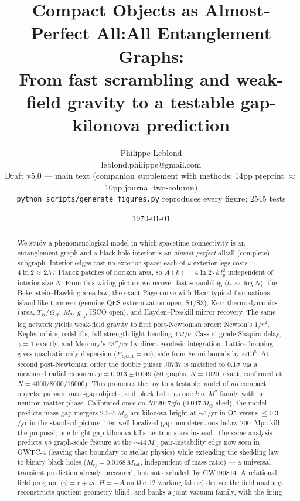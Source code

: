 \documentclass[11pt]{article}
\title{Compact Objects as Almost-Perfect All:All Entanglement Graphs:\\
\large From fast scrambling and weak-field gravity to a testable gap-kilonova prediction}
\author{Philippe Leblond \\ \small leblond.philippe@gmail.com \\
\small Draft v5.0 --- main text (companion supplement with methods; 14pp preprint $\approx$ 10pp journal two-column) \\
\small\texttt{python scripts/generate\_figures.py} reproduces every figure; 2545 tests}
\date{\today}
\begin{document}
\maketitle

\begin{abstract}
We study a phenomenological model in which spacetime connectivity is an
entanglement graph and a black-hole interior is an \emph{almost-perfect}
all:all (complete) subgraph. Interior edges cost no exterior space; each of
$k$ exterior legs costs $4\ln 2 \approx 2.77$ Planck patches of horizon area,
so $A(k) = 4\ln 2\cdot k\,l_p^2$ independent of interior size $N$. From this
wiring picture we recover fast scrambling ($t_* \sim \log N$), the
Bekenstein--Hawking area law, the exact Page curve with Haar-typical
fluctuations, island-like turnover (genuine QES extremization open,
S1/S3), Kerr thermodynamics (area, $T_H$/$\Omega_H$; $M_2$, $g_{t\phi}$, ISCO open), and Hayden--Preskill
mirror recovery. The same leg network yields weak-field gravity to first
post-Newtonian order: Newton's $1/r^2$, Kepler orbits, redshifts,
full-strength light bending $4M/b$, Cassini-grade Shapiro delay, $\gamma = 1$
exactly, and Mercury's $43''$/cy by direct geodesic integration. Lattice
hopping gives quadratic-only dispersion ($E_{QG,1} = \infty$), safe from Fermi
bounds by $\sim 10^8$. At second post-Newtonian order the double pulsar
J0737 is matched to $0.1\sigma$ via a measured radial exponent
$p = 0.913 \pm 0.049$ (80 graphs, $N = 1020$, exact; confirmed at
$N = 4000/8000/16000$). This promotes the toy to a testable model of
\emph{all} compact objects: pulsars, mass-gap objects, and black holes as one
$k \propto M^2$ family with no neutron-matter phase. Calibrated once on
AT2017gfo ($0.047\,M_\odot$ shed), the model predicts mass-gap mergers
$2.5$--$5\,M_\odot$ are kilonova-bright at $\sim 1$/yr in O5 versus
$\le 0.3$/yr in the standard picture. Ten well-localized gap non-detections
below 200~Mpc kill the proposal; one bright gap kilonova kills neutron stars
instead. The same analysis predicts \emph{no} graph-scale feature at the
$\sim 44\,M_\odot$ pair-instability edge now seen in GWTC-4 (leaving that
boundary to stellar physics) while extending the shedding law to binary
black holes ($M_{\mathrm{ej}} = 0.0168\,M_{\mathrm{tot}}$, independent of
mass ratio) --- a universal transient prediction already pressured, but not
excluded, by GW190814. A relational field program ($\psi = r+is$,
$H = -A$ on the J2 working fabric) derives the field anatomy, reconstructs
quotient geometry blind, and banks a joint vacuum family, with the firing

\end{abstract}
\end{document}
